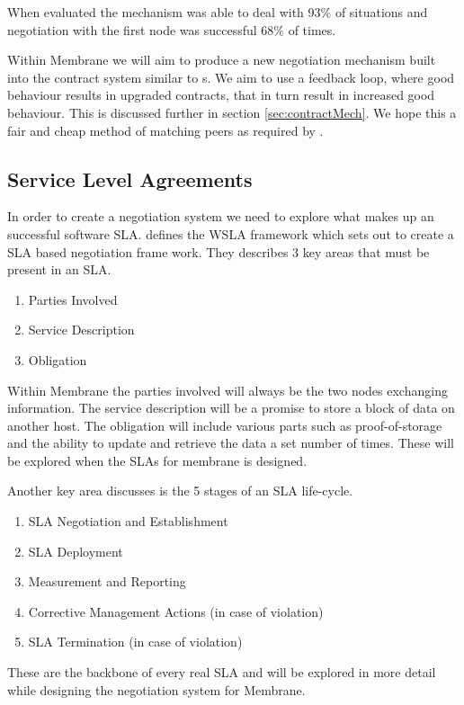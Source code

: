 \documentclass[11pt, a4paper, twocolumn, twoside]{report}
\begin{document}
When evaluated the mechanism was able to deal with 93\% of situations and negotiation with the first node was successful 68\% of times. \citep{herrero2007agents}

Within Membrane we will aim to produce a new negotiation mechanism built into the  contract system similar to \cite{paletta2009mas}s. We aim to use a feedback loop, where good behaviour results in upgraded contracts, that in turn result in increased good behaviour. This is discussed further in section \ref{sec:contractMech}. We hope this a fair and cheap method of matching peers as required by \cite{rahwan2005interest}.

\subsection{Service Level Agreements}

In order to create a negotiation system we need to explore what makes up an successful software SLA. \cite{keller2002defining} defines the WSLA framework which sets out to create a SLA based negotiation frame work.
They describes 3 key areas that must be present in an SLA.
\begin{enumerate}
 \item Parties Involved
 \item Service Description
 \item Obligation
\end{enumerate}

Within Membrane the parties involved will always be the two nodes exchanging information. The service description will be a promise to store a block of data on another host. The obligation will include various parts such as proof-of-storage and the ability to update and retrieve the data a set number of times. These will be explored when the SLAs for membrane is designed.

Another key area \cite{keller2002defining} discusses is the 5 stages of an SLA life-cycle.
\begin{enumerate}
 \item SLA Negotiation and Establishment
 \item SLA Deployment
 \item Measurement and Reporting
 \item Corrective Management Actions (in case of violation)
 \item SLA Termination (in case of violation)
\end{enumerate}

These are the backbone of every real SLA and will be explored in more detail while designing the negotiation system for Membrane.
\end{document}
